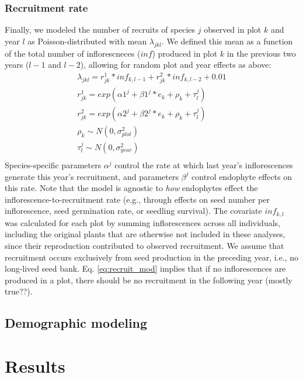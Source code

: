 \documentclass[11pt]{article}
\begin{document}
\subsubsection*{Recruitment rate}
Finally, we modeled the number of recruits of species $j$ observed in plot $k$ and year $l$ as Poisson-distributed with mean $\lambda_{jkl}$. 
We defined this mean as a function of the total number of inflorescneces ($inf$) produced in plot $k$ in the previous two years ($l-1$ and $l-2$), allowing for random plot and year effects as above:
\begin{align*}
	\lambda_{jkl} = r^{1}_{jk} * inf_{k,l-1} + r^{2}_{jk} * inf_{k,l-2} + 0.01\\
	r^{1}_{jk} = exp(\alpha1^{j} + \beta1^{j}*e_k + \rho_k + \tau^{j}_{l})\\
	r^{2}_{jk} = exp(\alpha2^{j} + \beta2^{j}*e_k + \rho_k + \tau^{j}_{l})\\	\rho_k \sim N(0,\sigma^2_{plot})\\
	\tau^{j}_{l} \sim N(0,\sigma^2_{year})\\
\end{align*}
Species-specific parameters $\alpha^{j}$ control the rate at which last year's inflorescences generate this year's recruitment, and parameters $\beta^{j}$ control endophyte effects on this rate. 
Note that the model is agnostic to \emph{how} endophytes effect the inflorescence-to-recruitment rate (e.g., through effects on seed number per inflorescence, seed germination rate, or seedling survival). 
The covariate $inf_{k,l}$ was calculated for each plot by summing inflorescences across all individuals, including the original plants that are otherwise not included in these analyses, since their reproduction contributed to observed recruitment. 
We assume that recruitment occurs exclusively from seed production in the preceding year, i.e., no long-lived seed bank. 
Eq. \ref{eq:recruit_mod} implies that if no inflorescences are produced in a plot, there should be no recruitment in the following year (mostly true??). 

\subsection*{Demographic modeling}

\section*{Results}
\end{document}

